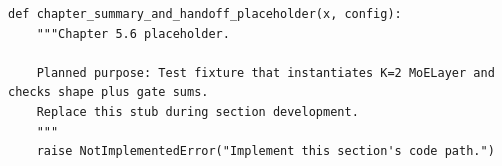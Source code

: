 \begin{lstlisting}[style=bookpython,caption={Planned code placeholder for chapter summary and handoff.},label={lst:ch05-chapter-summary-and-handoff}]
def chapter_summary_and_handoff_placeholder(x, config):
    """Chapter 5.6 placeholder.

    Planned purpose: Test fixture that instantiates K=2 MoELayer and checks shape plus gate sums.
    Replace this stub during section development.
    """
    raise NotImplementedError("Implement this section's code path.")
\end{lstlisting}
